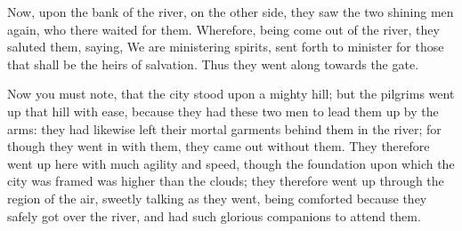 Now, upon the bank of the river, on the other side, they saw the two
shining men again, who there waited for them. Wherefore, being come out
of the river, they saluted them, saying, We are ministering spirits,
sent forth to minister for those that shall be the heirs of salvation.
Thus they went along towards the gate.

Now you must note, that the city stood upon a mighty hill; but the
pilgrims went up that hill with ease, because they had these two men to
lead them up by the arms: they had likewise left their mortal garments
behind them in the river; for though they went in with them, they came
out without them. They therefore went up here with much agility and
speed, though the foundation upon which the city was framed was higher
than the clouds; they therefore went up through the region of the air,
sweetly talking as they went, being comforted because they safely got
over the river, and had such glorious companions to attend them.

